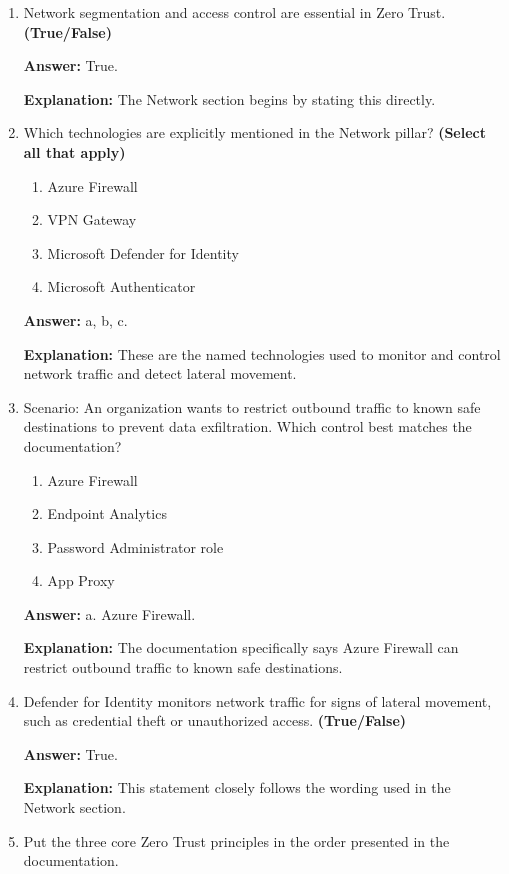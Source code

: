 \documentclass[10pt]{article}
\begin{document}
\begin{enumerate}[leftmargin=*]
\textbf{Explanation:} These are the exact governance examples listed under Azure Policy.

\item Network segmentation and access control are essential in Zero Trust. \textbf{(True/False)}

\textbf{Answer:} True.

\textbf{Explanation:} The Network section begins by stating this directly.

\item Which technologies are explicitly mentioned in the Network pillar? \textbf{(Select all that apply)}
\begin{enumerate}[label=\alph*., leftmargin=1.5em]
\item Azure Firewall
\item VPN Gateway
\item Microsoft Defender for Identity
\item Microsoft Authenticator
\end{enumerate}
\textbf{Answer:} a, b, c.

\textbf{Explanation:} These are the named technologies used to monitor and control network traffic and detect lateral movement.

\item Scenario: An organization wants to restrict outbound traffic to known safe destinations to prevent data exfiltration. Which control best matches the documentation?
\begin{enumerate}[label=\alph*., leftmargin=1.5em]
\item Azure Firewall
\item Endpoint Analytics
\item Password Administrator role
\item App Proxy
\end{enumerate}
\textbf{Answer:} a. Azure Firewall.

\textbf{Explanation:} The documentation specifically says Azure Firewall can restrict outbound traffic to known safe destinations.

\item Defender for Identity monitors network traffic for signs of lateral movement, such as credential theft or unauthorized access. \textbf{(True/False)}

\textbf{Answer:} True.

\textbf{Explanation:} This statement closely follows the wording used in the Network section.

\item Put the three core Zero Trust principles in the order presented in the documentation.


\end{enumerate}
\end{document}
